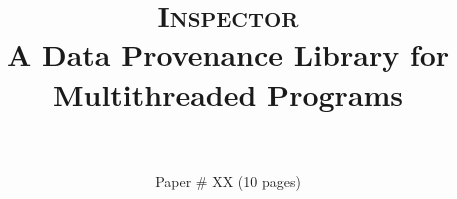 \documentclass{IEEEtran}
\newcommand{\projecttitle}{\textsc{Inspector}\xspace}
\begin{document}
\author{
\\
\\
Paper \# XX (10 pages)
}

\title{\huge \projecttitle\\A Data Provenance Library for Multithreaded Programs}
\maketitle
















\footnotesize


 
\end{document}
